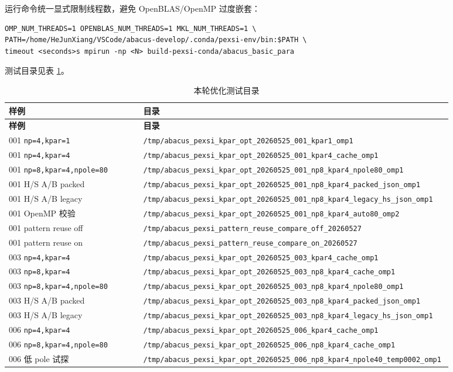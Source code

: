 \documentclass[a4paper,11pt]{article}
\newcommand{\code}[1]{\texttt{#1}}
\begin{document}
运行命令统一显式限制线程数，避免 OpenBLAS/OpenMP 过度嵌套：

\begin{verbatim}
OMP_NUM_THREADS=1 OPENBLAS_NUM_THREADS=1 MKL_NUM_THREADS=1 \
PATH=/home/HeJunXiang/VSCode/abacus-develop/.conda/pexsi-env/bin:$PATH \
timeout <seconds>s mpirun -np <N> build-pexsi-conda/abacus_basic_para
\end{verbatim}

测试目录见表 \ref{tab:test-dirs}。

\begin{longtable}{@{}p{0.30\linewidth}p{0.58\linewidth}@{}}
\caption{本轮优化测试目录}
\label{tab:test-dirs}\\
\toprule
\textbf{样例} & \textbf{目录}\\
\midrule
\endfirsthead
\toprule
\textbf{样例} & \textbf{目录}\\
\midrule
\endhead
001 \code{np=4,kpar=1} & \code{/tmp/abacus\_pexsi\_kpar\_opt\_20260525\_001\_kpar1\_omp1}\\
001 \code{np=4,kpar=4} & \code{/tmp/abacus\_pexsi\_kpar\_opt\_20260525\_001\_kpar4\_cache\_omp1}\\
001 \code{np=8,kpar=4,npole=80} & \code{/tmp/abacus\_pexsi\_kpar\_opt\_20260525\_001\_np8\_kpar4\_npole80\_omp1}\\
001 H/S A/B packed & \code{/tmp/abacus\_pexsi\_kpar\_opt\_20260525\_001\_np8\_kpar4\_packed\_json\_omp1}\\
001 H/S A/B legacy & \code{/tmp/abacus\_pexsi\_kpar\_opt\_20260525\_001\_np8\_kpar4\_legacy\_hs\_json\_omp1}\\
001 OpenMP 校验 & \code{/tmp/abacus\_pexsi\_kpar\_opt\_20260525\_001\_np8\_kpar4\_auto80\_omp2}\\
001 pattern reuse off & \code{/tmp/abacus\_pexsi\_pattern\_reuse\_compare\_off\_20260527}\\
001 pattern reuse on & \code{/tmp/abacus\_pexsi\_pattern\_reuse\_compare\_on\_20260527}\\
003 \code{np=4,kpar=4} & \code{/tmp/abacus\_pexsi\_kpar\_opt\_20260525\_003\_kpar4\_cache\_omp1}\\
003 \code{np=8,kpar=4} & \code{/tmp/abacus\_pexsi\_kpar\_opt\_20260525\_003\_np8\_kpar4\_cache\_omp1}\\
003 \code{np=8,kpar=4,npole=80} & \code{/tmp/abacus\_pexsi\_kpar\_opt\_20260525\_003\_np8\_kpar4\_npole80\_omp1}\\
003 H/S A/B packed & \code{/tmp/abacus\_pexsi\_kpar\_opt\_20260525\_003\_np8\_kpar4\_packed\_json\_omp1}\\
003 H/S A/B legacy & \code{/tmp/abacus\_pexsi\_kpar\_opt\_20260525\_003\_np8\_kpar4\_legacy\_hs\_json\_omp1}\\
006 \code{np=4,kpar=4} & \code{/tmp/abacus\_pexsi\_kpar\_opt\_20260525\_006\_kpar4\_cache\_omp1}\\
006 \code{np=8,kpar=4,npole=80} & \code{/tmp/abacus\_pexsi\_kpar\_opt\_20260525\_006\_np8\_kpar4\_cache\_omp1}\\
006 低 pole 试探 & \code{/tmp/abacus\_pexsi\_kpar\_opt\_20260525\_006\_np8\_kpar4\_npole40\_temp0002\_omp1}\\
\bottomrule
\end{longtable}
\end{document}
